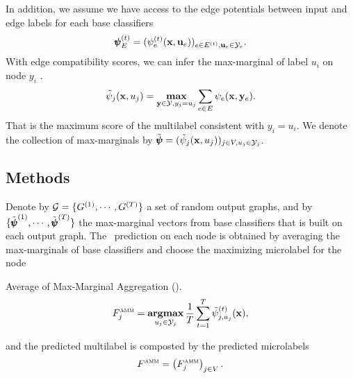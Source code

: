 {%
In addition, we assume we have access to the edge potentials between input and edge labels for each base classifiers
\begin{align*}
	\pmb \psi_E^{(t)} = (\psi_e^{(t)}(\mathbf {x},\mathbf {u}_e))_{e\in E^{(t)},\mathbf {u}_e\in\mathcal{Y}_e}.
\end{align*}
With edge compatibility scores, we can infer the max-marginal of label $u_i$ on node $y_i$ \citep{Wainwright05map}.
\begin{align*}
	\tilde{\psi}_j(\mathbf {x},u_j) = \underset{\mathbf {y}\in\mathcal{Y},y_j=u_j}{\textbf{max}}\sum_{e\in E}\psi_e(\mathbf {x},\mathbf {y}_e).
\end{align*}
That is the maximum score of the multilabel consistent with $y_i=u_i$.
We denote the collection of max-marginals by $\tilde{\pmb \psi} = (\tilde{\psi}_j(\mathbf {x},u_j))_{j\in V,u_j\in\mathcal{Y}_j}$.

\subsection{Methods}

Denote by  $\mathcal{G}=\{G^{(1)},\cdots,G^{(T)}\}$ a set of random output graphs, and by $\{\tilde{\pmb \psi}^{(1)},\cdots,\tilde{\pmb \psi}^{(T)}\}$ the max-marginal vectors from base classifiers that is built on each output graph.
The \amm\ prediction on each node is obtained by averaging the max-marginals of base classifiers and choose the maximizing microlabel for the node
\begin{definition}{Average of Max-Marginal Aggregation (\amm).}
	\begin{align*}
	F_j^{\text{{\sc amm}}}=\underset{u_j\in\mathcal{Y}_j}{\textbf{argmax}}\,\frac{1}{T}\sum_{t=1}^{T}\tilde{\psi}_{j,u_j}^{(t)}(\mathbf {x}),
	\end{align*}
\end{definition}
and the predicted multilabel is composted by the predicted microlabels
\begin{align*}
	F^{\text{{\sc amm}}}=\left(F_j^{\text{{\sc amm}}}\right)_{j\in V}.
\end{align*}

}
